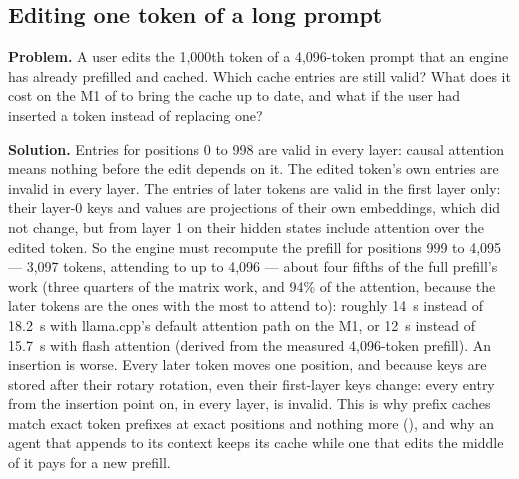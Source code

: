 \subsection{Editing one token of a long prompt}
\textbf{Problem.} A user edits the 1,000th token of a 4,096-token prompt that an
engine has already prefilled and cached. Which cache entries are still valid?
What does it cost on the M1 of  to bring the cache up to
date, and what if the user had inserted a token instead of replacing one?

\textbf{Solution.} Entries for positions 0 to 998 are valid in every layer:
causal attention means nothing before the edit depends on it. The edited
token's own entries are invalid in every layer. The entries of later tokens are
valid in the first layer only: their layer-0 keys and values are projections of
their own embeddings, which did not change, but from layer 1 on their hidden
states include attention over the edited token. So the engine must recompute
the prefill for positions 999 to 4,095 --- 3,097 tokens, attending to up to 4,096
--- about four fifths of the full prefill's work (three quarters of the matrix
work, and 94\% of the attention, because the later tokens are the ones with the
most to attend to): roughly 14~s instead of 18.2~s with llama.cpp's default
attention path on the M1, or 12~s instead of 15.7~s with flash attention
(derived from the measured 4,096-token prefill). An
insertion is worse. Every later token moves one position, and because keys are
stored after their rotary rotation, even their first-layer keys change: every
entry from the insertion point on, in every layer, is invalid. This is why
prefix caches match exact token prefixes at exact positions and nothing more
(), and why an agent that appends to its context keeps its
cache while one that edits the middle of it pays for a new prefill.
